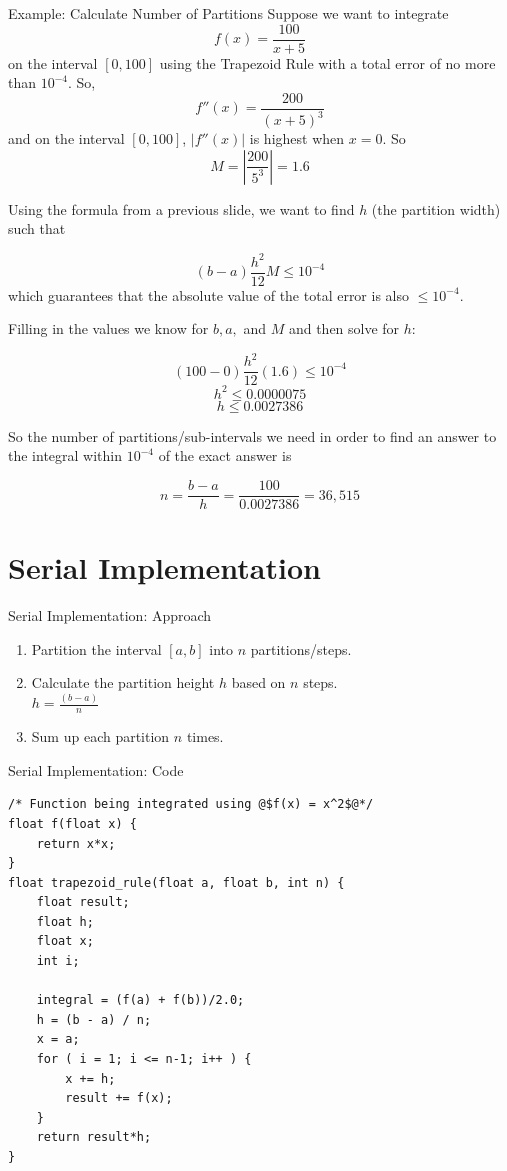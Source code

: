 \documentclass[t]{beamer}
\begin{document}
\begin{frame}[allowframebreaks]{Example: Calculate Number of Partitions}
Suppose we want to integrate
\[f(x)=\frac{100}{x+5}\]
on the interval $[0,100]$ using the Trapezoid Rule with a total error of no more than $10^{-4}$. So,
\[f''(x)=\frac{200}{(x+5)^3}\]
and on the interval $[0,100]$, $|f''(x)|$ is highest when $x=0$. So
\[M=\left|\frac{200}{5^3}\right|=1.6\]

\framebreak

Using the formula from a previous slide, we want to find $h$ (the partition width) such that

\[(b-a)\frac{h^2}{12}M\leq10^{-4}\]
which guarantees that the absolute value of the total error is also $\leq10^{-4}$.

Filling in the values we know for $b, a,$ and $M$ and then solve for $h$:

\[(100-0)\frac{h^2}{12}(1.6)\leq10^{-4}\]
\[h^2 \leq 0.0000075\]
\[h \leq 0.0027386\]

\framebreak

So the number of partitions/sub-intervals we need in order to find an answer to the integral within $10^{-4}$ of the exact answer is

\[n=\frac{b-a}{h}=\frac{100}{0.0027386}=36,515\]
\end{frame}

\section{Serial Implementation}
\begin{frame}{Serial Implementation: Approach}
	\begin{enumerate}
		\item Partition the interval $[a,b]$ into $n$ partitions/steps.
		\item Calculate the partition height $h$ based on $n$ steps. \\
			$h = \frac{(b-a)}{n}$
		\item Sum up each partition $n$ times.
	\end{enumerate}
\end{frame}

\begin{frame}[containsverbatim]{Serial Implementation: Code}
\begin{verbatim}
/* Function being integrated using @$f(x) = x^2$@*/
float f(float x) {
	return x*x;
}
float trapezoid_rule(float a, float b, int n) {
	float result;
	float h;
	float x;
	int i;

	integral = (f(a) + f(b))/2.0;
	h = (b - a) / n;
	x = a;
	for ( i = 1; i <= n-1; i++ ) {
		x += h;
		result += f(x);
	}
	return result*h;
}
\end{verbatim}
\end{frame}
\end{document}
